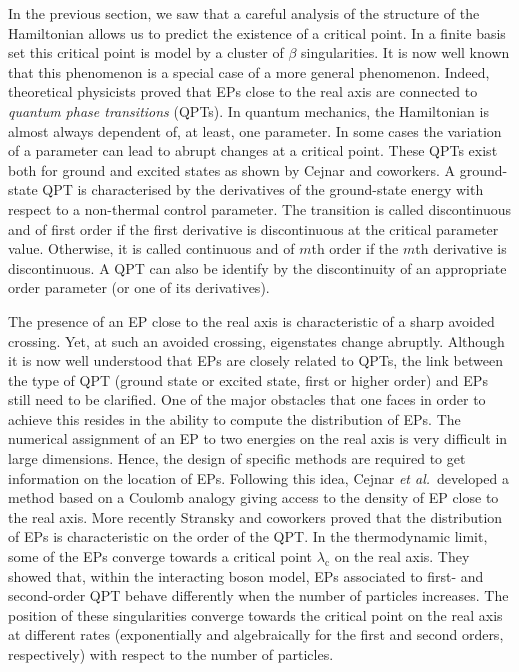 \documentclass[aps,prb,reprint,noshowkeys,linenumbers,superscriptaddress]{revtex4-1}
\begin{document}
In the previous section, we saw that a careful analysis of the structure of the Hamiltonian allows us to predict the existence of a critical point. 
In a finite basis set this critical point is model by a cluster of $\beta$ singularities. 
It is now well known that this phenomenon is a special case of a more general phenomenon. 
Indeed, theoretical physicists proved that EPs close to the real axis are connected to \textit{quantum phase transitions} (QPTs). \cite{Heiss_1988,Heiss_2002,Borisov_2015,Sindelka_2017,CarrBook,Vojta_2003,SachdevBook,GilmoreBook} 
In quantum mechanics, the Hamiltonian is almost always dependent of, at least, one parameter. 
In some cases the variation of a parameter can lead to abrupt changes at a critical point. 
These QPTs exist both for ground and excited states as shown by Cejnar and coworkers. \cite{Cejnar_2005,Cejnar_2007,Caprio_2008,Cejnar_2009,Sachdev_2011,Cejnar_2015,Cejnar_2016, Macek_2019,Cejnar_2020} 
A ground-state QPT is characterised by the derivatives of the ground-state energy with respect to a non-thermal control parameter. \cite{Cejnar_2009, Sachdev_2011} 
The transition is called discontinuous and of first order if the first derivative is discontinuous at the critical parameter value. 
Otherwise, it is called continuous and of $m$th order if the $m$th derivative is discontinuous. 
A QPT can also be identify by the discontinuity of an appropriate order parameter (or one of its derivatives). 

The presence of an EP close to the real axis is characteristic of a sharp avoided crossing. 
Yet, at such an avoided crossing, eigenstates change abruptly. 
Although it is now well understood that EPs are closely related to QPTs, the link between the type of QPT (ground state or excited state, first or higher order) and EPs still need to be clarified. 
One of the major obstacles that one faces in order to achieve this resides in the ability to compute the distribution of EPs. 
The numerical assignment of an EP to two energies on the real axis is very difficult in large dimensions. 
Hence, the design of specific methods are required to get information on the location of EPs. 
Following this idea, Cejnar \textit{et al.}~developed a method based on a Coulomb analogy giving access to the density of EP close to the real axis. \cite{Cejnar_2005, Cejnar_2007} 
More recently Stransky and coworkers proved that the distribution of EPs is characteristic on the order of the QPT. \cite{Stransky_2018} 
In the thermodynamic limit, some of the EPs converge towards a critical point $\lambda_\text{c}$ on the real axis. 
They showed that, within the interacting boson model, \cite{Lipkin_1965} EPs associated to first- and second-order QPT behave differently when the number of particles increases. 
The position of these singularities converge towards the critical point on the real axis at different rates (exponentially and algebraically for the first and second orders, respectively) with respect to the number of particles.
\end{document}
